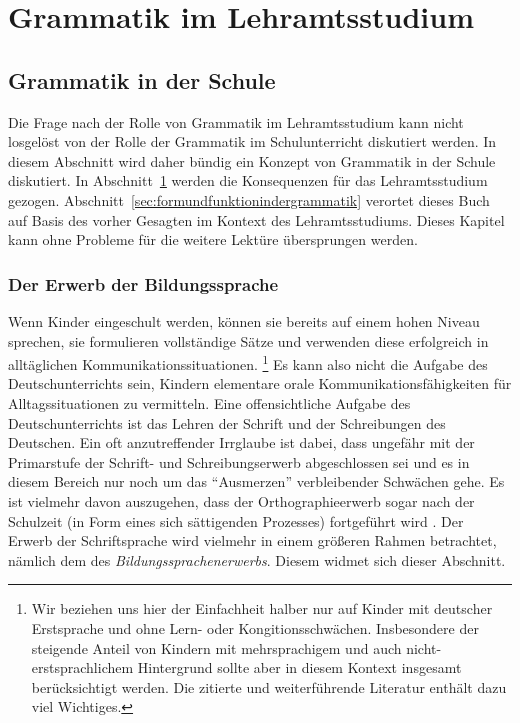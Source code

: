 \chapter{Grammatik im Lehramtsstudium}
\label{sec:grammatikimlehramtsstudium}


\section{Grammatik in der Schule}
\label{sec:grammatikinderschule}

Die Frage nach der Rolle von Grammatik im Lehramtsstudium kann nicht losgelöst von der Rolle der Grammatik im Schulunterricht diskutiert werden.
In diesem Abschnitt wird daher bündig ein Konzept von Grammatik in der Schule diskutiert.
In Abschnitt~\ref{sec:grammatikimlehramtsstudium} werden die Konsequenzen für das Lehramtsstudium gezogen.
Abschnitt~\ref{sec:formundfunktionindergrammatik} verortet dieses Buch auf Basis des vorher Gesagten im Kontext des Lehramtsstudiums.
Dieses Kapitel kann ohne Probleme für die weitere Lektüre übersprungen werden.

\subsection{Der Erwerb der Bildungssprache}
\label{sec:dererwerbderbildungssprache}

Wenn Kinder eingeschult werden, können sie bereits auf einem hohen Niveau sprechen, sie formulieren vollständige Sätze und verwenden diese erfolgreich in alltäglichen Kommunikationssituationen.%
\footnote{Wir beziehen uns hier der Einfachheit halber nur auf Kinder mit deutscher Erstsprache und ohne Lern- oder Kongitionsschwächen.
Insbesondere der steigende Anteil von Kindern mit mehrsprachigem und auch nicht-erstsprachlichem Hintergrund sollte aber in diesem Kontext insgesamt berücksichtigt werden.
Die zitierte und weiterführende Literatur enthält dazu viel Wichtiges.}
Es kann also nicht die Aufgabe des Deutschunterrichts sein, Kindern elementare orale Kommunikationsfähigkeiten für Alltagssituationen zu vermitteln.
Eine offensichtliche Aufgabe des Deutschunterrichts ist das Lehren der Schrift und der Schreibungen des Deutschen.
Ein oft anzutreffender Irrglaube ist dabei, dass ungefähr mit der Primarstufe der Schrift- und Schreibungserwerb abgeschlossen sei und es in diesem Bereich nur noch um das "`Ausmerzen"' verbleibender Schwächen gehe.
Es ist vielmehr davon auszugehen, dass der Orthographieerwerb sogar nach der Schulzeit (in Form eines sich sättigenden Prozesses) fortgeführt wird \citep[72]{Portmanntselikas2011}.
Der Erwerb der Schriftsprache wird vielmehr in einem größeren Rahmen betrachtet, nämlich dem des \textit{Bildungssprachenerwerbs}.
Diesem widmet sich dieser Abschnitt.

